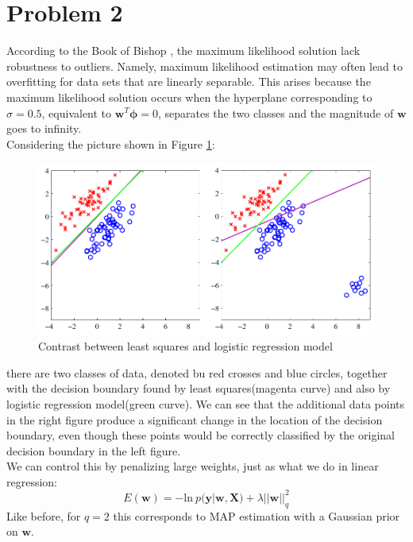 \documentclass{article}
\begin{document}
\section*{Problem 2}
According to the Book of Bishop \cite{bishop2007}, the maximum likelihood solution lack robustness to outliers. Namely, maximum likelihood estimation may often lead to overfitting for data sets that are linearly separable. This arises because the maximum likelihood solution occurs when the hyperplane corresponding to $\sigma=0.5$, equivalent to $\bm{w}^T\bm{\phi} = 0$, separates the two classes and the magnitude of $\bm{w}$ goes to infinity.\\
Considering the picture shown in  Figure \ref{Fig.Bishop}:
\begin{figure}
	\centering
	\includegraphics[scale=0.5]{MLEvsLRM.png}
	\caption{Contrast between least squares and logistic regression model}
	\label{Fig.Bishop}		
\end{figure}
there are two classes of data, denoted bu red crosses and blue circles, together with the decision boundary found by least squares(magenta curve) and also by logistic regression model(green curve). We can see that the additional data points in the right figure produce a significant change in the location of the decision boundary, even though these points would be correctly classified by the original decision boundary in the left figure.\\
We can control this by penalizing large weights, just as what we do in linear regression:
\begin{equation}
E(\bm{w}) = -\mathrm{ln}\ p(\bm{y}|\bm{w, X}) + \lambda||\bm{w}||_q^2
\end{equation}
Like before, for $q=2$ this corresponds to MAP estimation with a Gaussian prior on $\bm{w}$.
\end{document}
